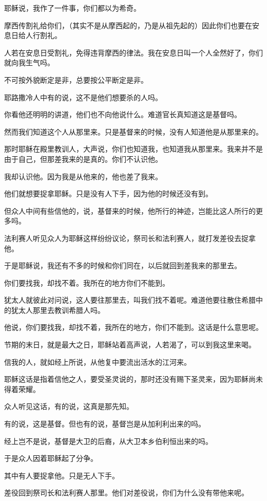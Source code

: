 \documentclass[12pt,oneside]{book}
\begin{document}
耶稣说，我作了一件事，你们都以为希奇。

摩西传割礼给你们，（其实不是从摩西起的，乃是从祖先起的）因此你们也要在安息日给人行割礼。

人若在安息日受割礼，免得违背摩西的律法。我在安息日叫一个人全然好了，你们就向我生气吗。

不可按外貌断定是非，总要按公平断定是非。

耶路撒冷人中有的说，这不是他们想要杀的人吗。

你看他还明明的讲道，他们也不向他说什么。难道官长真知道这是基督吗。

然而我们知道这个人从那里来。只是基督来的时候，没有人知道他是从那里来的。

那时耶稣在殿里教训人，大声说，你们也知道我，也知道我从那里来。我来并不是由于自己，但那差我来的是真的。你们不认识他。

我却认识他。因为我是从他来的，他也差了我来。

他们就想要捉拿耶稣。只是没有人下手，因为他的时候还没有到。

但众人中间有些信他的，说，基督来的时候，他所行的神迹，岂能比这人所行的更多吗。

法利赛人听见众人为耶稣这样纷纷议论，祭司长和法利赛人，就打发差役去捉拿他。

于是耶稣说，我还有不多的时候和你们同在，以后就回到差我来的那里去。

你们要找我，却找不着。我所在的地方你们不能到。

犹太人就彼此对问说，这人要往那里去，叫我们找不着呢。难道他要往散住希腊中的犹太人那里去教训希腊人吗。

他说，你们要找我，却找不着，我所在的地方，你们不能到。这话是什么意思呢。

节期的末日，就是最大之日，耶稣站着高声说，人若渴了，可以到我这里来喝。

信我的人，就如经上所说，从他复中要流出活水的江河来。

耶稣这话是指着信他之人，要受圣灵说的，那时还没有赐下圣灵来，因为耶稣尚未得着荣耀。

众人听见这话，有的说，这真是那先知。

有的说，这是基督。但也有的说，基督岂是从加利利出来的吗。

经上岂不是说，基督是大卫的后裔，从大卫本乡伯利恒出来的吗。

于是众人因着耶稣起了分争。

其中有人要捉拿他。只是无人下手。

差役回到祭司长和法利赛人那里。他们对差役说，你们为什么没有带他来呢。
\end{document}
